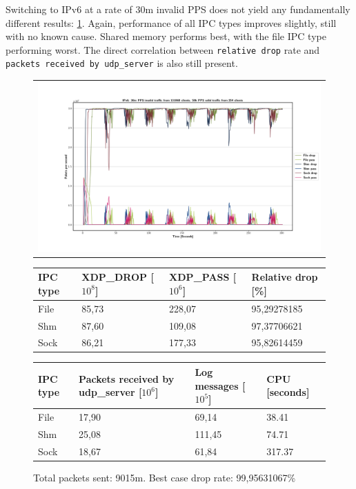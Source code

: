 Switching to IPv6 at a rate of 30m invalid PPS does not yield any fundamentally different results: \ref{fig:data:ipv6:30m:131068}.
Again, performance of all IPC types improves slightly, still with no known cause.
Shared memory performs best, with the file IPC type performing worst.
The direct correlation between \texttt{relative drop} rate and \texttt{packets received by udp\_server} is also still present.

\begin{figure}[!h]
	\centering
	\scriptsize
	\begin{tabular}{c}
    	\centerline{\includegraphics[width=1.2\textwidth]{images/IPv6_30m_131068_1.png}}
	\end{tabular}
	\begin{tabular}{llll}
		\toprule
		\textbf{IPC type} & \textbf{XDP\_DROP [$10^8$]} & \textbf{XDP\_PASS [$10^6$]} & \textbf{Relative drop [\%]} \\ \midrule 
		File & 85,73 & 228,07 & 95,29278185 \\
        Shm & 87,60 & 109,08 & 97,37706621 \\
        Sock & 86,21 & 177,33 & 95,82614459 \\
	\bottomrule
	\end{tabular}
    \begin{tabular}{llll}
		\toprule
		\textbf{IPC type} & \textbf{Packets received by udp\_server [$10^6$]} & \textbf{Log messages [$10^5$]} & \textbf{CPU [seconds]} \\ \midrule 
		File & 17,90 & 69,14 & 38.41 \\
        Shm & 25,08 & 111,45 & 74.71 \\
        Sock & 18,67 & 61,84 & 317.37 \\
	\bottomrule
	\end{tabular}
	\caption[Simplefail2ban, IPv6, 30m \ac{PPS}, 131068 malicious clients]{Total packets sent: 9015m. Best case drop rate: 99,95631067\%}
	\label{fig:data:ipv6:30m:131068}
\end{figure}

